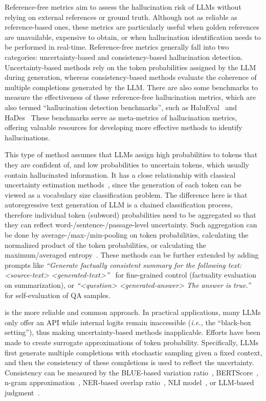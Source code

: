 Reference-free metrics aim to assess the hallucination risk of LLMs without relying on external references or ground truth. Although not as reliable as reference-based ones, these metrics are particularly useful when golden references are unavailable, expensive to obtain, or when hallucination identification needs to be performed in real-time. Reference-free metrics generally fall into two categories: uncertainty-based and consistency-based hallucination detection. Uncertainty-based methods rely on the token probabilities assigned by the LLM during generation, whereas consistency-based methods evaluate the coherence of multiple completions generated by the LLM. There are also some benchmarks to measure the effectiveness of these reference-free hallucination metrics, which are also termed ``hallucination detection benchmarks'', such as HaluEval~ and HaDes~ These benchmarks serve as meta-metrics of hallucination metrics, offering valuable resources for developing more effective methods to identify hallucinations.

This type of method assumes that LLMs assign high probabilities to tokens that they are confident of, and low probabilities to uncertain tokens, which usually contain hallucinated information. It has a close relationship with classical uncertainty estimation methods~, since the generation of each token can be viewed as a vocabulary size classification problem. The difference here is that autoregressive text generation of LLM is a chained classification process, therefore individual token (subword) probabilities need to be aggregated so that they can reflect word-/sentence-/passage-level uncertainty. Such aggregation can be done by average-/max-/min-pooling on token probabilities, calculating the normalized product of the token probabilities, or calculating the maximum/averaged entropy~. These methods can be further extended by adding prompts like \textit{``Generate factually consistent summary for the following text: {<source-text> <generated-text>}''}~ for fine-grained control (factuality evaluation on summarization), or \textit{``{<question> <generated-answer>} The answer is true.''}~ for self-evaluation of QA samples.

is the more reliable and common approach. In practical applications, many LLMs only offer an API while internal logits remain inaccessible (\textit{i.e.,} the ``black-box setting''), thus making uncertainty-based methods inapplicable. Efforts have been made to create surrogate approximations of token probability. Specifically, LLMs first generate multiple completions with stochastic sampling given a fixed context, and then the consistency of these completions is used to reflect the uncertainty. Consistency can be measured by the BLUE-based variation ratio~, BERTScore~, n-gram approximation~, NER-based overlap ratio~, NLI model~, or LLM-based judgment~.



